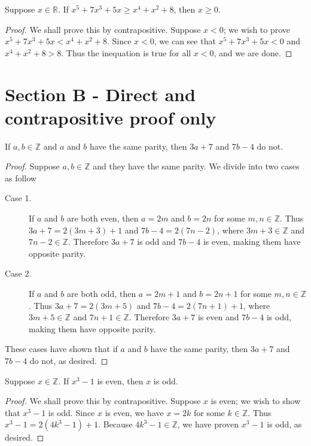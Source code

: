 \documentclass{exam}
\begin{document}
\begin{proposition}{5.13}
    Suppose $x\in\mathbb R$. If $x^5+7x^3+5x\ge x^4+x^2+8$, then $x\ge 0$.
\end{proposition}

\begin{proof}
    We shall prove this by contrapositive. Suppose $x<0$; we wish to prove $x^5+7x^3+5x< x^4+x^2+8$. Since $x<0$, we can see that $x^5+7x^3+5x < 0$ and $x^4+x^2+8 > 8$. Thus the inequation is true for all $x<0$, and we are done.
\end{proof}

\section{Section B - Direct and contrapositive proof only}

\begin{proposition}{5.14}
    If $a, b\in\mathbb Z$ and $a$ and $b$ have the same parity, then $3a+7$ and $7b-4$ do not.
\end{proposition}

\begin{proof}
    Suppose $a,b\in\mathbb Z$ and they have the same parity. We divide into two cases as follow
    \begin{description}
        \item[Case 1. ] If $a$ and $b$ are both even, then $a = 2m$ and $b=2n$ for some $m,n\in\mathbb Z$. Thus $3a + 7 = 2(3m+3)+1$ and $7b-4=2(7n-2)$, where $3m+3\in\mathbb Z$ and $7n-2\in\mathbb Z$. Therefore $3a + 7$ is odd and $7b-4$ is even, making them have opposite parity.
        \item[Case 2. ] If $a$ and $b$ are both odd, then $a = 2m + 1$ and $b = 2n + 1$ for some $m,n\in\mathbb Z$. Thus $3a+7=2(3m+5)$ and $7b-4=2(7n+1)+1$, where $3m + 5\in\mathbb Z$ and $7n + 1\in\mathbb Z$. Therefore $3a + 7$ is even and $7b-4$ is odd, making them have opposite parity.
    \end{description}
    These cases have shown that if $a$ and $b$ have the same parity, then $3a +7$ and $7b - 4$ do not, as desired.
\end{proof}

\begin{proposition}{5.15}
    Suppose $x\in\mathbb Z$. If $x^3-1$ is even, then $x$ is odd.
\end{proposition}

\begin{proof}
    We shall prove this by contrapositive. Suppose $x$ is even; we wish to show that $x^3-1$ is odd. Since $x$ is even, we have $x = 2k$ for some $k\in\mathbb Z$. Thus $x^3-1 = 2(4k^3-1)+1$. Because $4k^3-1\in\mathbb Z$, we have proven $x^3-1$ is odd, as desired.
\end{proof}
\end{document}
